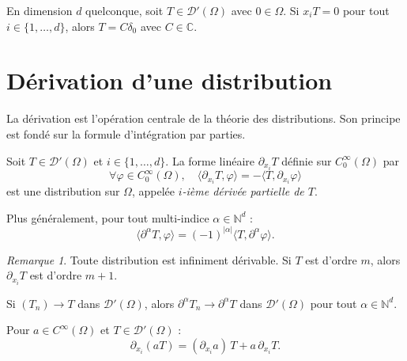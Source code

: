 \documentclass[12pt,a4paper,openany]{book}
\theoremstyle{definition}
\theoremstyle{plain}
\theoremstyle{remark}
\newtheorem*{remark}{Remarque}
\newenvironment{remarque}{\begin{remark}}{\end{remark}}
\begin{document}
	\begin{proposition}
		En dimension $d$ quelconque, soit $T \in \mathcal{D}'(\Omega)$ avec $0 \in \Omega$. Si $x_i T = 0$ pour tout $i \in \{1, \ldots, d\}$, alors $T = C\delta_0$ avec $C \in \mathbb{C}$.
	\end{proposition}
	
	\section{Dérivation d'une distribution}
	
	La dérivation est l'opération centrale de la théorie des distributions. Son principe est fondé sur la formule d'intégration par parties.
	
	\begin{definition}
		Soit $T \in \mathcal{D}'(\Omega)$ et $i \in \{1, \ldots, d\}$. La forme linéaire $\partial_{x_i} T$ définie sur $C_0^\infty(\Omega)$ par
		\[
		\forall \varphi \in C_0^\infty(\Omega), \quad \langle \partial_{x_i} T, \varphi \rangle = -\langle T, \partial_{x_i} \varphi \rangle
		\]
		est une distribution sur $\Omega$, appelée \emph{$i$-ième dérivée partielle de $T$}.
		
		Plus généralement, pour tout multi-indice $\alpha \in \mathbb{N}^d$ :
		\[
		\langle \partial^\alpha T, \varphi \rangle = (-1)^{|\alpha|} \langle T, \partial^\alpha \varphi \rangle.
		\]
	\end{definition}
	
	\begin{remarque}
		Toute distribution est infiniment dérivable. Si $T$ est d'ordre $m$, alors $\partial_{x_i} T$ est d'ordre $m+1$.
	\end{remarque}
	
	\begin{proposition}
		Si $(T_n) \to T$ dans $\mathcal{D}'(\Omega)$, alors $\partial^\alpha T_n \to \partial^\alpha T$ dans $\mathcal{D}'(\Omega)$ pour tout $\alpha \in \mathbb{N}^d$.
	\end{proposition}
	
	\begin{proposition}
		Pour $a \in C^\infty(\Omega)$ et $T \in \mathcal{D}'(\Omega)$ :
		\[
		\partial_{x_i}(aT) = (\partial_{x_i} a)\,T + a\,\partial_{x_i} T.
		\]
	\end{proposition}
	
\end{document}
